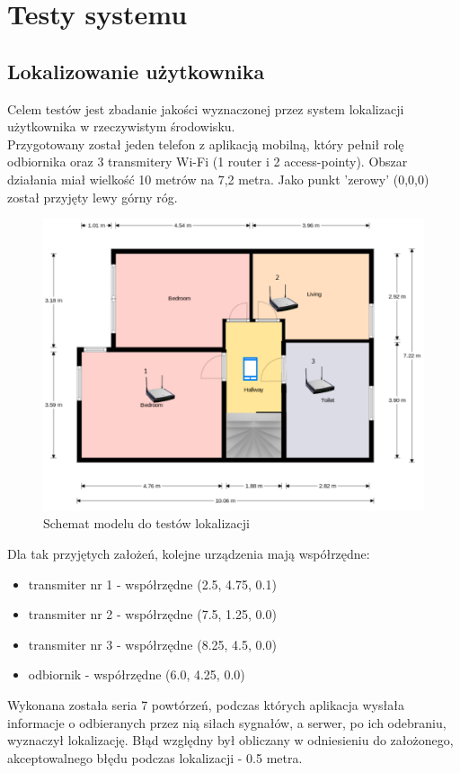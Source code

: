 \chapter{Testy systemu}
\section{Lokalizowanie użytkownika}
Celem testów jest zbadanie jakości wyznaczonej przez system lokalizacji użytkownika w rzeczywistym środowisku.\\
Przygotowany został jeden telefon z aplikacją mobilną, który pełnił rolę odbiornika oraz 3 transmitery Wi-Fi (1 router i 2 access-pointy). Obszar działania miał wielkość 10 metrów na 7,2 metra. Jako punkt 'zerowy' (0,0,0) został przyjęty lewy górny róg. 
\begin{figure}[H]			
	\centering
	\caption{Schemat modelu do testów lokalizacji}
	\includegraphics[width=1.0\textwidth]{plan}
\end{figure}
Dla tak przyjętych założeń, kolejne urządzenia mają współrzędne:
\begin{itemize}
	\item transmiter nr 1 - współrzędne (2.5, 4.75, 0.1)
	\item transmiter nr 2 - współrzędne (7.5, 1.25, 0.0)
	\item transmiter nr 3 - współrzędne (8.25, 4.5, 0.0)
	\item odbiornik - współrzędne (6.0, 4.25, 0.0)
\end{itemize}
Wykonana została seria 7 powtórzeń, podczas których aplikacja wysłała informacje o odbieranych przez nią siłach sygnałów, a serwer, po ich odebraniu, wyznaczył lokalizację. Błąd względny był obliczany w odniesieniu do założonego, akceptowalnego błędu podczas lokalizacji - 0.5 metra.

